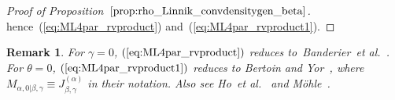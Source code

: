 \documentclass[a4paper,12pt]{article}
\newtheorem{remark}{Remark}
\begin{document}
{{{\begin{proof}[Proof of Proposition~$\ref{prop:rho_Linnik_convdensitygen_beta}$]
 hence~(\ref{eq:ML4par_rvproduct}) and~(\ref{eq:ML4par_rvproduct1}).
\end{proof}
\begin{remark}
\label{rem:ML4par_rvproduct}
For $\gamma=0$, $(\ref{eq:ML4par_rvproduct})$  reduces to~Banderier~{\it  et al.}~{\rm \cite[Lemma~3.14]{Banderier}}.
For  $\theta=0$, $(\ref{eq:ML4par_rvproduct1})$  
reduces to Bertoin and Yor~{\rm \cite[Lemma~6(ii)]{BertoinYor}}, 
where $M_{\alpha,0 \vert\beta,\gamma} \equiv J^{(\alpha)}_{\beta,\gamma}$ in their notation.
Also see Ho~{\it  et al.}~{\rm \cite[Proposition~2.1, Remark~2.3]{HoJamesLau}}
and M\"{o}hle~{\rm \cite[Corollary~3]{Mohle}}.
\end{remark}

}}}
\end{document}

